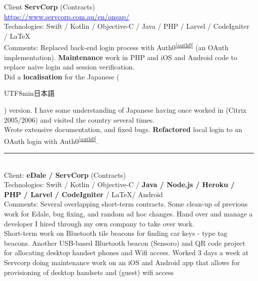 \documentclass{article}
\begin{document}
Client    \textbf  { ServCorp} (Contracts) \\ 
\textcolor{blue} { \underline{https://www.servcorp.com.au/en/oneap/ }} \\
Technologies: Swift / Kotlin / Objective-C / Java / PHP / Larvel / CodeIgniter / \LaTeX \\


Comments: 
Replaced back-end login process with Auth0\textsuperscript{\ref{auth0}} (an OAuth implementation). {\bf Maintenance} work in PHP and iOS and Android code to replace naive login and session verification. \\
Did a {\bf localisation} for the Japanese (\begin{CJK}{UTF8}{min}日本語\end{CJK} ) version.  I have some understanding of Japanese having once worked in (Citrix 2005/2006) and visited the country several times. \\
Wrote extensive documentation, and fixed bugs. {\bf Refactored} local login to an OAuth login with Auth0\textsuperscript{\ref{auth0}}.
\\

\noindent\hfil\rule{0.5\textwidth}{.4pt}\hfil
\\

Client:    \textbf  { eDale / ServCorp} (Contracts)   \\
Technologies: Swift / Kotlin / Objective-C / \textbf  {Java / Node.js / Heroku / PHP / Larvel / CodeIgniter } / \LaTeX  / Android \\

Comments: Several overlapping short-term contracts. Some clean-up of previous work for Edale, bug fixing, and random ad hoc changes.  Hand over and manage a developer I hired through my own company to take over work. \\
 Short-term work on Bluetooth tile beacons for finding car keys - type tag beacons. Another USB-based Bluetooth beacon (Sensoro) and QR code project for allocating desktop handset phones and Wifi access. Worked 3 days a week at Servcorp doing  maintenance work on an iOS and Android app that allows for provisioning of desktop handsets  and (guest) wifi access \\

\end{document}
